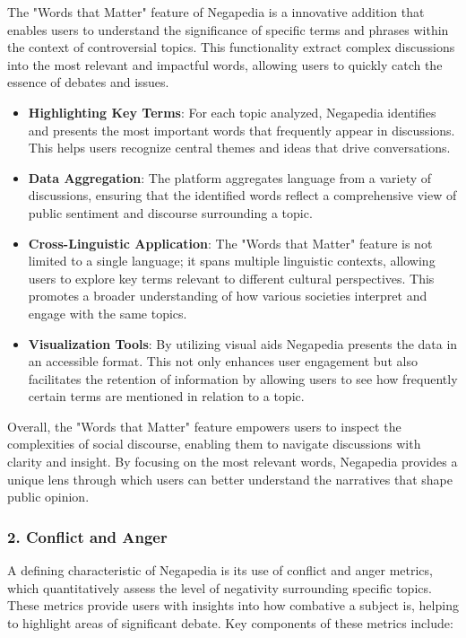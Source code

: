 The "Words that Matter" feature of Negapedia is a innovative addition that enables users to understand the significance of specific terms and phrases within the context of controversial topics. This functionality extract complex discussions into the most relevant and impactful words, allowing users to quickly catch the essence of debates and issues.

\begin{itemize}
    \item \textbf{Highlighting Key Terms}: For each topic analyzed, Negapedia identifies and presents the most important words that frequently appear in discussions. This helps users recognize central themes and ideas that drive conversations.
    \item \textbf{Data Aggregation}: The platform aggregates language from a variety of discussions, ensuring that the identified words reflect a comprehensive view of public sentiment and discourse surrounding a topic.
    \item \textbf{Cross-Linguistic Application}: The "Words that Matter" feature is not limited to a single language; it spans multiple linguistic contexts, allowing users to explore key terms relevant to different cultural perspectives. This promotes a broader understanding of how various societies interpret and engage with the same topics.
    \item \textbf{Visualization Tools}: By utilizing visual aids Negapedia presents the data in an accessible format. This not only enhances user engagement but also facilitates the retention of information by allowing users to see how frequently certain terms are mentioned in relation to a topic.
\end{itemize}

Overall, the "Words that Matter" feature empowers users to inspect the complexities of social discourse, enabling them to navigate discussions with clarity and insight. By focusing on the most relevant words, Negapedia provides a unique lens through which users can better understand the narratives that shape public opinion.

\subsubsection{2. Conflict and Anger}

A defining characteristic of Negapedia is its use of conflict and anger metrics, which quantitatively assess the level of negativity surrounding specific topics. These metrics provide users with insights into how combative a subject is, helping to highlight areas of significant debate. Key components of these metrics include:

